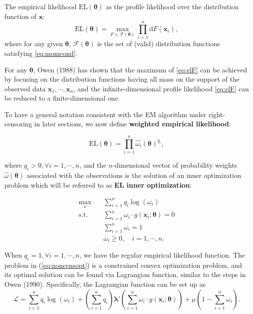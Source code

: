 \documentclass[article]{jss}
\renewcommand{\|}{\,|\,}
\begin{document}
The empirical likelihood \(\textrm{EL}(\bm \theta)\) as the profile likelihood over the distribution function of \(\bm x\):
\begin{equation} \label{eq:elF}
  \textrm{EL}(\bm \theta) = \max_{F \in \mathcal F(\bm \theta)} \prod_{i=1}^n \mathrm{d} F(\bm x_i),
\end{equation}
where for any given \(\bm \theta\), \(\mathcal F(\bm \theta)\) is the set of (valid) distribution functions satisfying \eqref{eq:momcond}.

For any \(\bm \theta\), Owen (1988) has shown that the maximum of \eqref{eq:elF} can be achieved by focusing on the distribution functions having all mass on the support of the observed data \(\bm x_1, \cdots, \bm x_n\), and the infinite-dimensional profile likelihood \eqref{eq:elF} can be reduced to a finite-dimensional one.

To have a general notation consistent with the EM algorithm under right-censoring in later sections, we now define \textbf{weighted empirical likelihood}:

\begin{equation}
  \textrm{EL}(\bm \theta) = \prod_{i=1}^n \hat{\omega_i}(\bm \theta)^{q_i},
\end{equation}

where \(q_i > 0, \forall i=1,\cdots,n\), and the \(n\)-dimensional vector of probability weights \(\hat{\omega}(\bm \theta)\) associated with the observations is the solution of an inner optimization problem which will be referred to as \textbf{EL inner optimization}:

\begin{equation} \label{eq:noncensopt}
\begin{split}
  \max_{\omega}\quad & \sum_{i=1}^n q_i \log(\omega_i) \\
  \text{s.t.}\quad & \sum_{i=1}^n \omega_i\cdot g(\bm x_i;\bm \theta) = 0 \\
  & \sum_{i=1}^n \omega_i = 1 \\
  & \omega_i \geq 0, \quad i=1,\cdots,n.
\end{split}
\end{equation}

When \(q_i = 1, \forall i=1,\cdots,n\), we have the regular empirical likelihood function. The problem in (\ref{eq:noncensopt}) is a constrained convex optimization problem, and its optimal solution can be found via Lagrangian function, similar to the steps in Owen (1990). Specifically, the Lagrangian function can be set up as
\begin{equation} \label{eq:lagrange}
  \mathcal{L}= \sum_{i=1}^n q_i\log(\omega_i) + (\sum_{i=1}^n q_i)\bm \lambda'(\sum_{i=1}^n \omega_i \cdot g(\bm x_i;\bm \theta)) + \mu(1-\sum_{i=1}^n \omega_i).
\end{equation}
\end{document}
